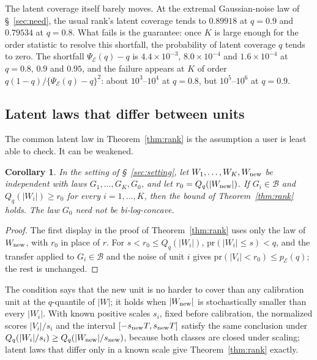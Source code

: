 \documentclass[12pt]{article}
\newtheorem{corollary}{Corollary}
\theoremstyle{definition}
\newcommand{\pr}{\mathrm{pr}}
\newcommand{\B}{\mathcal{B}}
\newcommand{\E}{\mathcal{E}}
\begin{document}
The latent coverage itself barely moves. At the extremal Gaussian-noise law of \S~\ref{sec:need}, the usual rank's latent coverage tends to $0.89918$ at $q = 0.9$ and $0.79534$ at $q = 0.8$. What fails is the guarantee: once $K$ is large enough for the order statistic to resolve this shortfall, the probability of latent coverage $q$ tends to zero. The shortfall $\Psi_{\E}(q) - q$ is $4.4 \times 10^{-3}$, $8.0 \times 10^{-4}$ and $1.6 \times 10^{-4}$ at $q = 0.8$, $0.9$ and $0.95$, and the failure appears at $K$ of order $q(1 - q)/\{\Psi_{\E}(q) - q\}^2$: about $10^3$--$10^4$ at $q = 0.8$, but $10^5$--$10^6$ at $q = 0.9$.

\subsection{Latent laws that differ between units}

The common latent law in Theorem~\ref{thm:rank} is the assumption a user is least able to check. It can be weakened.

\begin{corollary}\label{cor:hetero}
In the setting of \S~\ref{sec:setting}, let $W_1, \ldots, W_K, W_{\rm new}$ be independent with laws $G_1, \ldots, G_K, G_0$, and let $r_0 = Q_q(|W_{\rm new}|)$. If $G_i \in \B$ and $Q_q(|W_i|) \ge r_0$ for every $i = 1, \ldots, K$, then the bound of Theorem~\ref{thm:rank} holds. The law $G_0$ need not be bi-log-concave.
\end{corollary}

\begin{proof}
The first display in the proof of Theorem~\ref{thm:rank} uses only the law of $W_{\rm new}$, with $r_0$ in place of $r$. For $s < r_0 \le Q_q(|W_i|)$, $\pr(|W_i| \le s) < q$, and the transfer applied to $G_i \in \B$ and the noise of unit $i$ gives $\pr(|V_i| < r_0) \le p_{\E}(q)$; the rest is unchanged.
\end{proof}

The condition says that the new unit is no harder to cover than any calibration unit at the $q$-quantile of $|W|$; it holds when $|W_{\rm new}|$ is stochastically smaller than every $|W_i|$. With known positive scales $s_i$, fixed before calibration, the normalized scores $|V_i|/s_i$ and the interval $[-s_{\rm new}T, s_{\rm new}T]$ satisfy the same conclusion under $Q_q(|W_i|/s_i) \ge Q_q(|W_{\rm new}|/s_{\rm new})$, because both classes are closed under scaling; latent laws that differ only in a known scale give Theorem~\ref{thm:rank} exactly.
\end{document}
